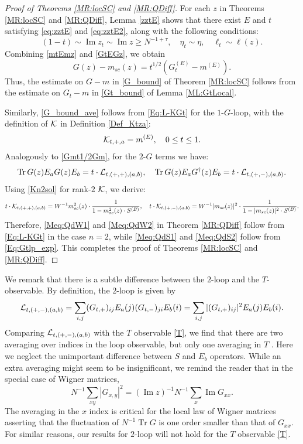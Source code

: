 \documentclass[10pt,reqno]{article}
\DeclareMathOperator{\im}{{\mathrm{Im}}}
\DeclareMathOperator{\tr}{Tr}
\theoremstyle{plain} %
\theoremstyle{remark}
\numberwithin{equation}{section}
\begin{document}
\begin{proof}[Proof of Theorems \ref{MR:locSC} and \ref{MR:QDiff}]
For each $z$ in Theorems \ref{MR:locSC} and \ref{MR:QDiff}, Lemma \ref{zztE} shows that there exist $E$ and $t$ satisfying \eqref{eq:zztE} and \eqref{eq:zztE2}, along with the following conditions:
$$
(1-t) \sim \im z_t \sim \im z \geq N^{-1+\tau}, \quad \eta_t \sim \eta, \quad \ell_t \sim \ell(z).
$$
Combining \eqref{mtEmz} and \eqref{GtEGz}, we obtain
\begin{equation}\label{Gmt1/2Gm}
G(z) - m_{sc}(z) = t^{1/2} \left(G_t^{(E)} - m^{(E)}\right).
\end{equation}
Thus, the estimate on $G - m$ in \eqref{G_bound} of Theorem \ref{MR:locSC} follows from the estimate on $G_t - m$ in \eqref{Gt_bound} of Lemma \ref{ML:GtLocal}.

Similarly, \eqref{G_bound_ave} follows from \eqref{Eq:L-KGt} for the $1$-$G$-loop, with the definition of $\cal K$ in Definition \ref{Def_Ktza}:
$$
{\cal K}_{t,+,a} = m^{(E)}, \quad 0\le t\le 1. 
$$
Analogously to \eqref{Gmt1/2Gm}, for the $2$-$G$ terms we have:
\begin{equation}\label{Gmt1/2Gm2}
\tr G (z) E_aG (z) E_b = t \cdot {\cal L}_{t, (+,+),(a,b)}, \quad \tr G(z) E_aG^\dagger(z)  E_b = t \cdot {\cal L}_{t, (+,-),(a,b)}.
\end{equation}
Using \eqref{Kn2sol} for rank-$2$ $\cal K$, we derive:
$$
t \cdot {\cal K}_{t, (+,+),(a,b)} = W^{-1} m^2_{sc}(z) \cdot \frac{1}{1 - m^2_{sc}(z) \cdot S^{(B)}}, \quad t \cdot {\cal K}_{t, (+,-),(a,b)} = W^{-1} |m_{sc}(z)|^2 \cdot \frac{1}{1 - |m_{sc}(z)|^2 \cdot S^{(B)}}.
$$
Therefore, \eqref{Meq:QdW1} and \eqref{Meq:QdW2} in Theorem \ref{MR:QDiff} follow from \eqref{Eq:L-KGt} in the case $n=2$, while \eqref{Meq:QdS1} and \eqref{Meq:QdS2} follow from \eqref{Eq:Gtlp_exp}. 
This completes the proof of Theorems \ref{MR:locSC} and \ref{MR:QDiff}.
 \end{proof}


We remark that there is a  subtle difference between the $2$-loop and the  $T$-observable. 
By definition, the $2$-loop is given by 
$$
{\cal L}_{t, (+,-),(a,b)}= \sum_{i, j}   (G_{t,+})_{ij}  E_a(j) (G_{t,-})_{ji}   E_b(i)=  \sum_{i, j}   |(G_{t,+})_{ij}|^2  E_a(j) E_b(i).
$$
Comparing ${\cal L}_{t, (+,-),(a,b)}$ with the  $T$ observable \eqref{T}, we find that there are two averaging over indices in the  loop observable, but  only one averaging in   $T$ .  Here we neglect the  unimportant  difference between $S$ and $E_b$ operators.
While an extra averaging might seem to be insignificant, we remind the reader that in the special case of Wigner matrices,  
\[
N^{-1} \sum_{x y} |G_{x,y}|^2 = (\im z )^{-1}N^{-1}  \sum_x \im G_{xx}. 
\]
The averaging  in the $x$ index is critical for the local law of  Wigner matrices asserting that   the fluctuation of $N^{-1} \tr G$ is one order smaller than that of $G_{xx}$.  For similar reasons, our results for $2$-loop will not hold for the $T$ observable \eqref{T}.
\end{document}
